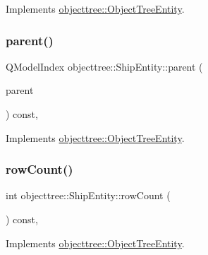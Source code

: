 Implements \mbox{\hyperlink{classobjecttree_1_1_object_tree_entity_a9ccaab3b27e65b1ed8b22f00c57a1082}{objecttree\+::\+Object\+Tree\+Entity}}.

\mbox{\label{classobjecttree_1_1_ship_entity_adafd4b75476c3d15829c75bae3cb2166}} 
\subsubsection{\texorpdfstring{parent()}{parent()}}
{\footnotesize\ttfamily Q\+Model\+Index objecttree\+::\+Ship\+Entity\+::parent (\begin{DoxyParamCaption}\item[{const Q\+Model\+Index \&}]{parent }\end{DoxyParamCaption}) const\hspace{0.3cm}{\ttfamily [override]}, {\ttfamily [virtual]}}



Implements \mbox{\hyperlink{classobjecttree_1_1_object_tree_entity_a2d1b13c056476f87637aacd7e99e7305}{objecttree\+::\+Object\+Tree\+Entity}}.

\mbox{\label{classobjecttree_1_1_ship_entity_a725ce29cc4d65bdf546d77aef042a046}} 
\subsubsection{\texorpdfstring{rowCount()}{rowCount()}}
{\footnotesize\ttfamily int objecttree\+::\+Ship\+Entity\+::row\+Count (\begin{DoxyParamCaption}{ }\end{DoxyParamCaption}) const\hspace{0.3cm}{\ttfamily [override]}, {\ttfamily [virtual]}}



Implements \mbox{\hyperlink{classobjecttree_1_1_object_tree_entity_a82c626bb28c55dcfce11cf7ec3368588}{objecttree\+::\+Object\+Tree\+Entity}}.

\mbox{\label{classobjecttree_1_1_ship_entity_ae237b6bde73cb4a24e0c17a6a67b58b1}} 
